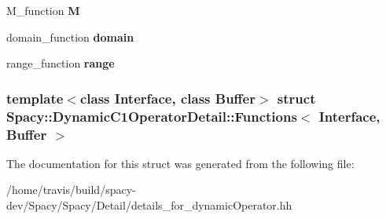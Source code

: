 \begin{DoxyCompactItemize}
\item 
\hypertarget{structSpacy_1_1DynamicC1OperatorDetail_1_1Functions_ae57bb5c1149d1d1961885fe03566f9de}{\-M\-\_\-function {\bfseries \-M}}\label{structSpacy_1_1DynamicC1OperatorDetail_1_1Functions_ae57bb5c1149d1d1961885fe03566f9de}

\item 
\hypertarget{structSpacy_1_1DynamicC1OperatorDetail_1_1Functions_a490db0ae70686dd7498b9ccc3f13b0d0}{domain\-\_\-function {\bfseries domain}}\label{structSpacy_1_1DynamicC1OperatorDetail_1_1Functions_a490db0ae70686dd7498b9ccc3f13b0d0}

\item 
\hypertarget{structSpacy_1_1DynamicC1OperatorDetail_1_1Functions_a041e1b604a18fd696ae462ef73644bcc}{range\-\_\-function {\bfseries range}}\label{structSpacy_1_1DynamicC1OperatorDetail_1_1Functions_a041e1b604a18fd696ae462ef73644bcc}

\end{DoxyCompactItemize}
\subsubsection*{template$<$class \-Interface, class \-Buffer$>$ struct Spacy\-::\-Dynamic\-C1\-Operator\-Detail\-::\-Functions$<$ Interface, Buffer $>$}



\-The documentation for this struct was generated from the following file\-:\begin{DoxyCompactItemize}
\item 
/home/travis/build/spacy-\/dev/\-Spacy/\-Spacy/\-Detail/details\-\_\-for\-\_\-dynamic\-Operator.\-hh\end{DoxyCompactItemize}
